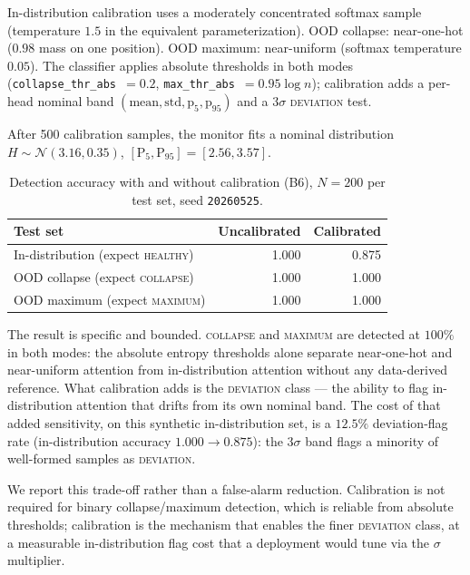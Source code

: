 \documentclass[11pt,a4paper]{article}
\theoremstyle{plain}
\begin{document}
In-distribution calibration uses a moderately concentrated softmax
sample (temperature $1.5$ in the equivalent parameterization).
OOD collapse: near-one-hot ($0.98$ mass on one position).
OOD maximum: near-uniform (softmax temperature $0.05$).
The classifier applies absolute thresholds in both modes
(\texttt{collapse\_thr\_abs}~$=0.2$, \texttt{max\_thr\_abs}~$=0.95\log n$);
calibration adds a per-head nominal band $(\text{mean},\text{std},
\text{p}_5,\text{p}_{95})$ and a $3\sigma$ \textsc{deviation} test.

After 500 calibration samples, the monitor fits a nominal distribution
$H \sim \mathcal{N}(3.16, 0.35)$,
$[\text{P}_5, \text{P}_{95}] = [2.56, 3.57]$.

\begin{table}[h]
\centering
\caption{Detection accuracy with and without calibration (B6),
  $N = 200$ per test set, seed \texttt{20260525}.}
\label{tab:b6}
\begin{tabular}{lrr}
\toprule
Test set & Uncalibrated & Calibrated \\
\midrule
In-distribution (expect \textsc{healthy}) & 1.000 & 0.875 \\
OOD collapse (expect \textsc{collapse})   & 1.000 & 1.000 \\
OOD maximum (expect \textsc{maximum})     & 1.000 & 1.000 \\
\bottomrule
\end{tabular}
\end{table}

The result is specific and bounded. \textsc{collapse} and
\textsc{maximum} are detected at $100\%$ in both modes: the absolute
entropy thresholds alone separate near-one-hot and near-uniform
attention from in-distribution attention without any data-derived
reference. What calibration adds is the \textsc{deviation} class --- the
ability to flag in-distribution attention that drifts from its own
nominal band. The cost of that added sensitivity, on this synthetic
in-distribution set, is a $12.5\%$ deviation-flag rate
(in-distribution accuracy $1.000 \to 0.875$): the $3\sigma$ band
flags a minority of well-formed samples as \textsc{deviation}.

We report this trade-off rather than a false-alarm reduction.
Calibration is not required for binary collapse/maximum detection,
which is reliable from absolute thresholds; calibration is the
mechanism that enables the finer \textsc{deviation} class, at a
measurable in-distribution flag cost that a deployment would tune via
the $\sigma$ multiplier.
\end{document}

